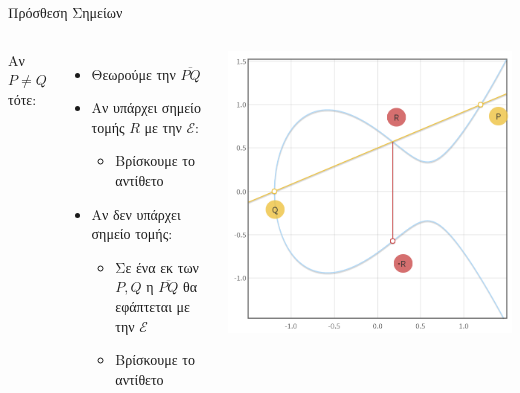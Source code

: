 \documentclass[handout]{beamer}
\begin{document}
\begin{frame}[allowframebreaks]{Πρόσθεση Σημείων}
\begin{columns}
Αν $P \neq Q$ τότε:
\begin{itemize}
\item Θεωρούμε την $\overline{PQ}$
\item Αν υπάρχει σημείο τομής $R$ με την $\mathcal{E}$:
\begin{itemize}
	\item Βρίσκουμε το αντίθετο
\end{itemize}
\item Αν δεν υπάρχει σημείο τομής:
\begin{itemize}
	\item Σε ένα εκ των $P,Q$ η $\overline{PQ}$ θα εφάπτεται με την $\mathcal{E}$ 
	\item Βρίσκουμε το αντίθετο
\end{itemize} 
\end{itemize}
\begin{center}
\includegraphics[scale=0.23]{add.png} \\

\end{center}
\end{columns}
\end{frame}
\end{document}
